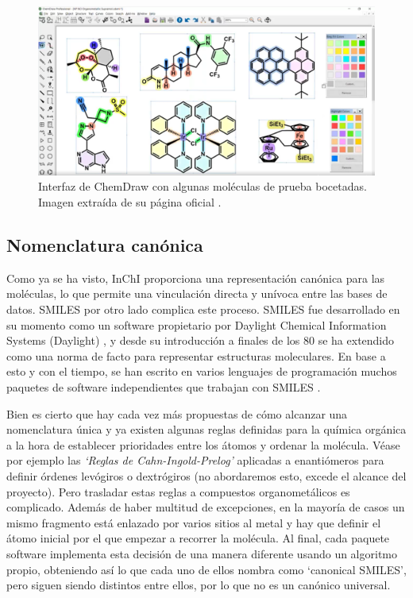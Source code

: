 \begin{figure}[h!]
    \centering
    \includegraphics[scale=0.34]{imagenes/estado_arte/chemdraw.png}
    \caption{Interfaz de ChemDraw con algunas moléculas de prueba bocetadas. Imagen extraída de su página oficial \cite{chemdraw_page}.}
    \label{fig:chemdraw}
\end{figure}

\subsection{Nomenclatura canónica} \label{estado:canon}
Como ya se ha visto, InChI proporciona una representación canónica para las moléculas, lo que permite una vinculación directa y unívoca entre las bases de datos. SMILES por otro lado complica este proceso. SMILES fue desarrollado en su momento como un software propietario por Daylight Chemical Information Systems (Daylight) \cite{daylight}, y desde su introducción a finales de los 80 se ha extendido como una norma de facto para representar estructuras moleculares. En base a esto y con el tiempo, se han escrito en varios lenguajes de programación muchos paquetes de software independientes que trabajan con SMILES \cite{opensmiles}.

Bien es cierto que hay cada vez más propuestas de cómo alcanzar una nomenclatura única \cite{weininger_smiles_1989, inchi1, nextmove_software_facto_nodate, baoilleach_we_nodate, universal_smiles} y ya existen algunas reglas definidas para la química orgánica a la hora de establecer prioridades entre los átomos y ordenar la molécula. Véase por ejemplo las \emph{`Reglas de Cahn-Ingold-Prelog'} aplicadas a enantiómeros \cite{cahn_specification_1966, prelog_basic_1982, NOMENCLATURA_R_S} para definir órdenes levógiros o dextrógiros (no abordaremos esto, excede el alcance del proyecto). Pero trasladar estas reglas a compuestos organometálicos es complicado. Además de haber multitud de excepciones, en la mayoría de casos un mismo fragmento está enlazado por varios sitios al metal y hay que definir el átomo inicial por el que empezar a recorrer la molécula. Al final, cada paquete software implementa esta decisión de una manera diferente usando un algoritmo propio, obteniendo así lo que cada uno de ellos nombra como `canonical SMILES', pero siguen siendo distintos entre ellos, por lo que no es un canónico universal.

